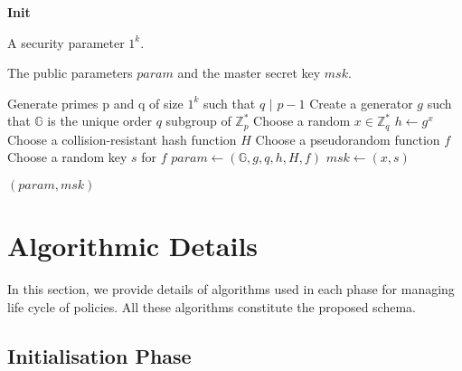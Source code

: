 \documentclass[final,5p,times,twocolumn]{elsarticle}
\newcommand{\algofontsize}{\fontsize{7}{8}\selectfont}
\begin{document}
\begin{algorithm}[htp]
{\algofontsize
\caption{\textbf{Init}}

\label{algo:init}

\begin{algorithmic}[1]

\REQUIRE A security parameter $1^k$.

\ENSURE The public parameters $param$ and the master secret key $msk$.

\medskip

\STATE Generate primes p and q of size $1^k$ such that $q$ $|$ $p - 1$ \label{line:primes}
\STATE Create a generator $g$ such that $\mathbb{G}$ is the unique order $q$ subgroup of $\mathbb{Z}^*_p$ \label{line:generator}
\STATE Choose a random $x \in \mathbb{Z}^*_q$ \label{line:master-x}
\STATE $h \leftarrow g^x$ \label{line:params-h}
\STATE Choose a collision-resistant hash function $H$ \label{line:params-H}
\STATE Choose a pseudorandom function $f$ \label{line:params-f}
\STATE Choose a random key $s$ for $f$ \label{line:master-s}
\STATE $param \leftarrow (\mathbb{G}, g, q, h, H, f)$ \label{line:params}
\STATE $msk \leftarrow (x, s)$ \label{line:master}

\RETURN $(param, msk)$

\end{algorithmic}
}
\end{algorithm}



\section{Algorithmic Details}
\label{sec:algorithmic-details}

In this section, we provide details of algorithms used in each phase for managing life cycle of policies. All these algorithms constitute the proposed schema. 

\subsection{Initialisation Phase}
\end{document}
